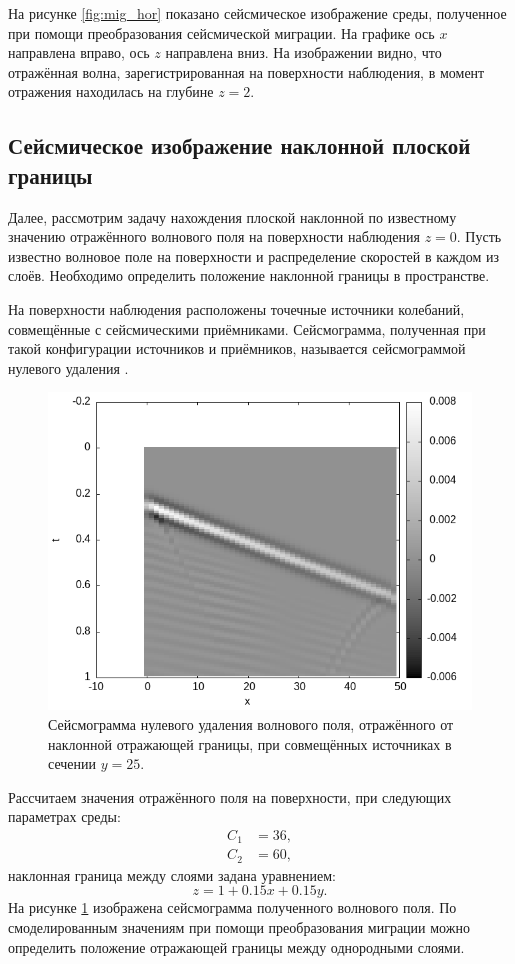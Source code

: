 \documentclass[a4paper, fontsize=14pt]{article}
\begin{document}
	На рисунке \ref{fig:mig_hor} показано сейсмическое изображение среды, полученное при помощи преобразования сейсмической миграции. 
	На графике ось $x$ направлена вправо, ось $z$ направлена вниз.
	На изображении видно, что отражённая волна, зарегистрированная на поверхности наблюдения, в момент отражения находилась на глубине $z = 2$.
	
	
	\subsection{Сейсмическое изображение наклонной плоской границы}
	
	Далее, рассмотрим задачу нахождения плоской наклонной по известному значению отражённого волнового поля на поверхности наблюдения $z=0$.
	Пусть известно волновое поле на поверхности и распределение скоростей в каждом из слоёв. Необходимо определить положение наклонной границы в пространстве.
	
	На поверхности наблюдения расположены точечные источники колебаний, совмещённые с сейсмическими приёмниками. 
	Сейсмограмма, полученная при такой конфигурации источников и приёмников, называется сейсмограммой нулевого удаления \cite{timoshin}. 
	\begin{figure}[H]
		\centering
		\includegraphics[width=.7\textwidth]{tilt15c36_centr_seism.png}
		\caption{Сейсмограмма нулевого удаления волнового поля, отражённого от наклонной отражающей границы, при совмещённых источниках  в сечении $y=25$.}
		\label{fig:mig_tilt_seism}
	\end{figure}
	Рассчитаем значения отражённого поля на поверхности, при следующих параметрах среды: 
	\begin{align*}
		C_1 &= 36, \\
		C_2 &= 60,
	\end{align*}
	наклонная граница между слоями задана уравнением:
	\begin{equation}
		z=1+0.15 x+0.15 y.
		\label{eq:mig_mod}
	\end{equation}
	На рисунке \ref{fig:mig_tilt_seism} изображена сейсмограмма полученного волнового поля.
	По смоделированным значениям при помощи преобразования миграции можно определить положение отражающей границы между однородными слоями.  
	
\end{document}
